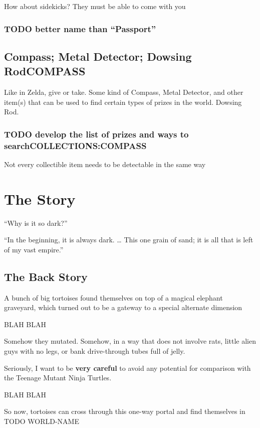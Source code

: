 \documentclass[11pt]{article}
\begin{document}
How about sidekicks? They must be able to come with you

\subsubsection{{\bfseries\sffamily TODO} better name than “Passport”}
\label{sec-1-21-1}
\subsection{Compass; Metal Detector; Dowsing Rod\hfill{}\textsc{COMPASS}}
\label{sec-1-22}

Like in Zelda, give or take. Some kind of Compass, Metal Detector,
and other item(s) that can be used to find certain types of prizes in
the world. Dowsing Rod.

\subsubsection{{\bfseries\sffamily TODO} develop the list of prizes and ways to search\hfill{}\textsc{COLLECTIONS:COMPASS}}
\label{sec-1-22-1}

Not every collectible item needs to be detectable in the same way
\section{The Story}
\label{sec-2}

“Why is it so dark?”

“In the beginning, it is always dark. … This one grain of sand; it is
all that is left of my vast empire.”

\subsection{The Back Story}
\label{sec-2-1}

A bunch of big tortoises found themselves on top of a magical
elephant graveyard, which turned out to be a gateway to a special
alternate dimension

BLAH BLAH

Somehow they mutated. Somehow, in a way that does not involve rats,
little alien guys with no legs, or bank drive-through tubes full
of jelly.

Seriously, I want to be \textbf{very careful} to avoid any potential for
comparison with the Teenage Mutant Ninja Turtles.

BLAH BLAH

So now, tortoises can cross through this one-way portal and find
themselves in TODO WORLD-NAME
\end{document}
